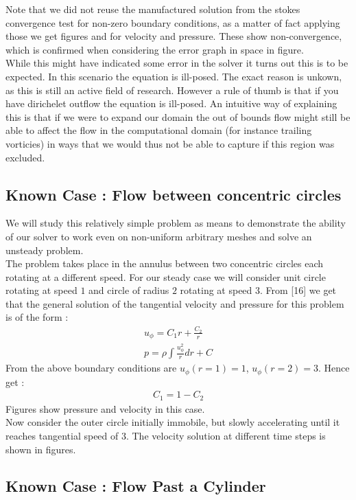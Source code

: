 \documentclass[11pt,twoside,a4paper]{article}
\begin{document}
Note that we did not reuse the manufactured solution from the stokes convergence test for non-zero boundary conditions, as a matter of fact applying those we get figures and  for velocity and pressure. These show non-convergence, which is confirmed when considering the error graph in space in figure.\\
While this might have indicated some error in the solver it turns out this is to be expected. In this scenario the equation is ill-posed. The exact reason is unkown, as this is still an active field of research. However a rule of thumb is that if you have dirichelet outflow the equation is ill-posed. An intuitive way of explaining this is that if we were to expand our domain the out of bounds flow might still be able to affect the flow in the computational domain (for instance trailing vorticies) in ways that we would thus not be able to capture if this region was excluded.

\subsection{Known Case : Flow between concentric circles}

We will study this relatively simple problem as means to demonstrate the ability of our solver to work even on non-uniform arbitrary meshes and solve an unsteady problem.\\
The problem takes place in the annulus between two concentric circles each rotating at a different speed. For our steady case we will consider unit circle rotating at speed $1$ and circle of radius $2$ rotating at speed $3$.
From [16] we get that the general solution of the tangential velocity and pressure for this problem is of the form :
\begin{align}
u_{\phi} = C_1 r + \frac{C_2}{r} \\
p = \rho \int \frac{u_{\phi}^2}{r} dr + C
\end{align}
From the above boundary conditions are $u_{\phi}(r=1) = 1$, $u_{\phi}(r=2) = 3$. Hence get :
\begin{align*}
C_1 = 1 - C_2
\end{align*}
Figures show pressure and velocity in this case.\\

Now consider the outer circle initially immobile, but slowly accelerating until it reaches tangential speed of $3$. The velocity solution at different time steps is shown in figures.

\subsection{Known Case : Flow Past a Cylinder}
\end{document}
